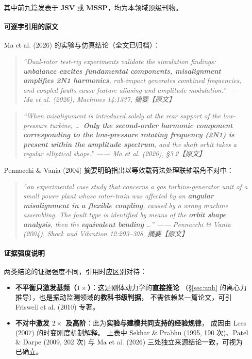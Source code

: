 \documentclass[11pt,a4paper]{ctexart}
\begin{document}
\noindent
其中前九篇发表于 \textbf{JSV} 或 \textbf{MSSP}，均为本领域顶级刊物。

\paragraph{可逐字引用的原文}

Ma et al. (2026) 的实验与仿真结论（全文已归档）：

\begin{quote}
\small\itshape
“Dual-rotor test-rig experiments validate the simulation findings: \textbf{unbalance excites
fundamental components, misalignment amplifies 2N1 harmonics}, rub-impact generates combined
frequencies, and coupled faults cause feature aliasing and amplitude modulation.”
\hfill —— Ma et al. (2026), \emph{Machines} 14:1337, 摘要【原文】
\end{quote}

\begin{quote}
\small\itshape
“When misalignment is introduced solely at the rear support of the low-pressure turbine,
\dots\ \textbf{Only the second-order harmonic component corresponding to the low-pressure
rotating frequency (2N1) is present within the amplitude spectrum}, and the shaft orbit
takes a regular elliptical shape.”
\hfill —— Ma et al. (2026), \S3.2【原文】
\end{quote}

Pennacchi \& Vania (2004) 摘要明确指出以等效载荷法处理联轴器角不对中：

\begin{quote}
\small\itshape
“an experimental case study that concerns a gas turbine-generator unit of a small power plant
whose rotor-train was affected by an \textbf{angular misalignment in a flexible coupling},
caused by a wrong machine assembling. The fault type is identified by means of the
\textbf{orbit shape analysis}, then the \textbf{equivalent bending} \dots”
\hfill —— Pennacchi \& Vania (2004), \emph{Shock and Vibration} 12:293--308, 摘要【原文】
\end{quote}

\paragraph{证据强度说明}

两类结论的证据强度不同，引用时应区别对待：

\begin{itemize}[leftmargin=1.2em]
\item \textbf{不平衡只激发基频（\(1\times\)）}：这是刚体动力学的\textbf{直接推论}
（\S\ref{sec:unb} 的离心力推导），也是振动监测领域的\textbf{教科书级判据}，
  不需依赖某一篇论文，可引 Friswell et al. (2010) 专著。
\item \textbf{不对中激发 \(2\times\) 及高阶}：此为\textbf{实验与建模共同支持的经验规律}，
  成因由 Lees (2007) 的时变刚度机制解释。
  上表中 Sekhar \& Prabhu (1995, 190 次)、Patel \& Darpe (2009, 202 次)
  与 Ma et al. (2026) 三处独立来源结论一致，可视为已确立。
\end{itemize}
\end{document}
